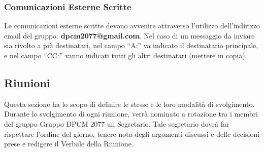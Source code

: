 \subsubsection{Comunicazioni Esterne Scritte}
Le comunicazioni esterne scritte devono avvenire attraverso l’utilizzo dell’indirizzo email del gruppo: \textbf{dpcm2077@gmail.com}. 
Nel caso di un messaggio da inviare sia rivolto a più destinatari, nel campo “A:” va indicato il destinatario principale, e nel campo “CC:” vanno indicati tutti gli altri destinatari (mettere in copia).

\subsection{Riunioni}
Questa sezione ha lo scopo di definire le stesse e le loro modalità di svolgimento. Durante lo svolgimento di ogni riunione, verrà nominato a rotazione tra i membri del gruppo Gruppo DPCM 2077 un Segretario. 
Tale segretario dovrà far rispettare l’ordine del giorno, tenere nota degli argomenti discussi e delle decisioni prese e redigere il Verbale della Riunione.


